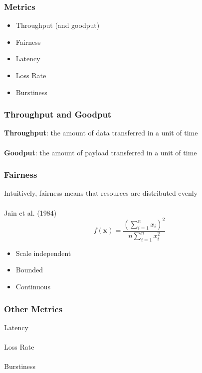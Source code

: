 \documentclass{beamer}
\begin{document}
\begin{frame}
\frametitle{Metrics}
\begin{itemize}
	\item Throughput (and goodput)
	\item Fairness
	\item Latency
	\item Loss Rate
	\item Burstiness	
\end{itemize}
\end{frame}

\begin{frame}
\frametitle{Throughput and Goodput}
\textbf{Throughput}: the amount of data transferred in a unit of time\\~\\

\textbf{Goodput}: the amount of payload transferred in a unit of time
\end{frame}

\begin{frame}
\frametitle{Fairness}
Intuitively, fairness means that resources are distributed evenly\\~\\

Jain et al. (1984)
\begin{equation*}
f(\textbf{x}) = \frac{ \left(\sum\limits_{i=1}^{n} x_i\right)^2 }{n \sum\limits_{i=1}^{n} x_i^2 } 
\end{equation*}

\begin{itemize}
	\item Scale independent
	\item Bounded
	\item Continuous
\end{itemize}

\end{frame}

\begin{frame}
\frametitle{Other Metrics}

Latency\\~\\

Loss Rate\\~\\

Burstiness\\~\\

\end{frame}
\end{document}
